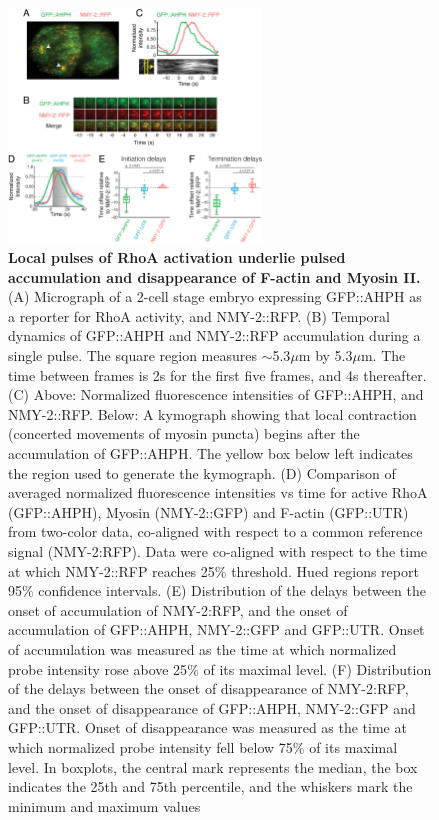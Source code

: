 \begin{figure}[!htbp]
\centering
\includegraphics[width=0.6\textwidth]{pulse/Figure2-4}

\caption[Local pulses of RhoA activation underlie pulsed accumulation and disappearance of F-actin and Myosin II.]{\label{fig:224}\textbf{Local pulses of RhoA activation underlie pulsed accumulation and disappearance of F-actin and Myosin II.} (A) Micrograph of a 2-cell stage embryo expressing GFP::AHPH as a reporter for RhoA activity, and NMY-2::RFP. (B) Temporal dynamics of GFP::AHPH and NMY-2::RFP accumulation during a single pulse. The square region measures $\sim$5.3$\mu$m by 5.3$\mu$m. The time between frames is 2s for the first five frames, and 4s thereafter. (C) Above: Normalized fluorescence intensities of GFP::AHPH, and NMY-2::RFP. Below: A kymograph showing that local contraction (concerted movements of myosin puncta) begins after the accumulation of GFP::AHPH. The yellow box below left indicates the region used to generate the kymograph. (D) Comparison of averaged normalized fluorescence intensities vs time for active RhoA (GFP::AHPH), Myosin (NMY-2::GFP) and F-actin (GFP::UTR) from two-color data, co-aligned with respect to a common reference signal (NMY-2:RFP). Data were co-aligned with respect to the time at which NMY-2::RFP reaches 25$\%$ threshold. Hued regions report 95$\%$ confidence intervals. (E) Distribution of the delays between the onset of accumulation of NMY-2:RFP, and the onset of accumulation of GFP::AHPH, NMY-2::GFP and GFP::UTR. Onset of accumulation was measured as the time at which normalized probe intensity rose above 25$\%$ of its maximal level. (F) Distribution of the delays between the onset of disappearance of NMY-2:RFP, and the onset of disappearance of GFP::AHPH, NMY-2::GFP and GFP::UTR. Onset of disappearance was measured as the time at which normalized probe intensity fell below 75$\%$ of its maximal level. In boxplots, the central mark represents the median, the box indicates the 25th and 75th percentile, and the whiskers mark the minimum and maximum values}\end{figure}


